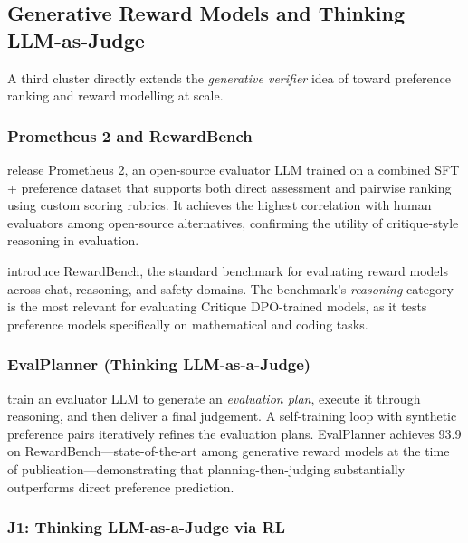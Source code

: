 \subsection{Generative Reward Models and Thinking LLM-as-Judge}
\label{sec:thinking-judge}

A third cluster directly extends the \emph{generative verifier} idea
of \autocite{zhang2024generativeverifiersrewardmodeling} toward
preference ranking and reward modelling at scale.

\subsubsection{Prometheus 2 and RewardBench}

\autocite{kim2024prometheus2} release Prometheus 2, an open-source
evaluator LLM trained on a combined SFT + preference dataset that
supports both direct assessment and pairwise ranking using custom
scoring rubrics.  It achieves the highest correlation with human
evaluators among open-source alternatives, confirming the utility of
critique-style reasoning in evaluation.

\autocite{lambert2024rewardbench} introduce RewardBench, the standard
benchmark for evaluating reward models across chat, reasoning, and
safety domains.  The benchmark's \emph{reasoning} category is the most
relevant for evaluating Critique DPO-trained models, as it tests
preference models specifically on mathematical and coding tasks.

\subsubsection{EvalPlanner (Thinking LLM-as-a-Judge)}

\autocite{saha2025evalplanner} train an evaluator LLM to generate an
\emph{evaluation plan}, execute it through reasoning, and then deliver
a final judgement.  A self-training loop with synthetic preference
pairs iteratively refines the evaluation plans.  EvalPlanner achieves
93.9 on RewardBench—state-of-the-art among generative reward models
at the time of publication—demonstrating that planning-then-judging
substantially outperforms direct preference prediction.

\subsubsection{J1: Thinking LLM-as-a-Judge via RL}

